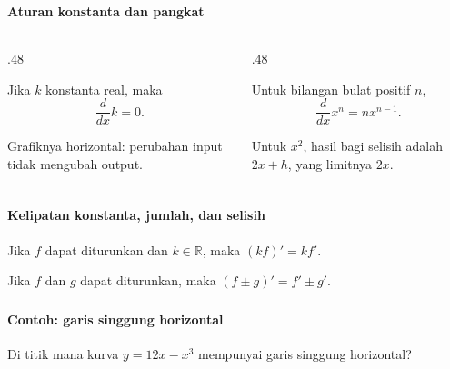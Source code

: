\documentclass{../../kalkulus-ppt}
\begin{document}
\begin{frame}
\frametitle{\insertsection}
\framesubtitle{Aturan konstanta dan pangkat}

\begin{columns}[t]
\begin{column}{.48\textwidth}
\begin{teorema}
Jika $k$ konstanta real, maka
\[\frac{d}{dx}k=0.\]
\end{teorema}
Grafiknya horizontal: perubahan input tidak mengubah output.
\end{column}
\begin{column}{.48\textwidth}
\begin{teorema}
Untuk bilangan bulat positif $n$,
\[\frac{d}{dx}x^n=nx^{n-1}.\]
\end{teorema}
Untuk $x^2$, hasil bagi selisih adalah $2x+h$, yang limitnya $2x$.
\end{column}
\end{columns}
\end{frame}


\begin{frame}
\frametitle{\insertsection}
\framesubtitle{Kelipatan konstanta, jumlah, dan selisih}

\begin{teorema}
Jika $f$ dapat diturunkan dan $k\in\mathbb R$, maka $(kf)'=kf'$.
\end{teorema}
\begin{teorema}
Jika $f$ dan $g$ dapat diturunkan, maka $(f\pm g)'=f'\pm g'$.
\end{teorema}
\end{frame}


\begin{frame}
\frametitle{\insertsection}
\framesubtitle{Contoh: garis singgung horizontal}

\begin{contoh}
Di titik mana kurva $y=12x-x^3$ mempunyai garis singgung horizontal?
\end{contoh}
\end{frame}
\end{document}
